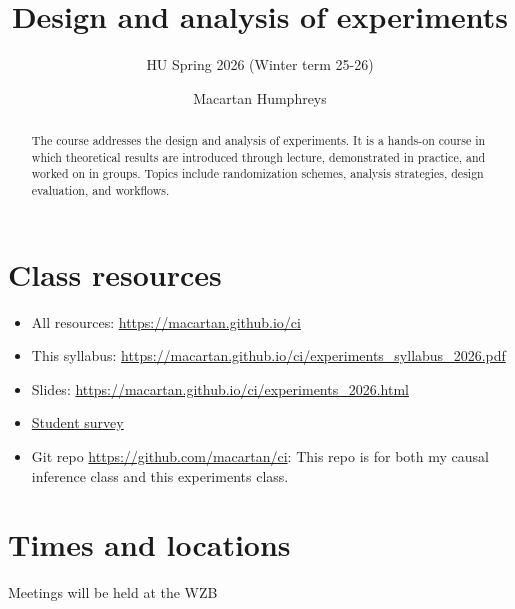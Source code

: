 \documentclass[
  10pt,
  a4paper,10pt]{extarticle}
\title{Design and analysis of experiments}
\subtitle{HU \textbar{} Spring 2026 (Winter term 25-26)}
\author{Macartan Humphreys}
\date{}
\begin{document}
\maketitle
\begin{abstract}
The course addresses the design and analysis of experiments. It is a
hands-on course in which theoretical results are introduced through
lecture, demonstrated in practice, and worked on in groups. Topics
include randomization schemes, analysis strategies, design evaluation,
and workflows.
\end{abstract}


\section{Class resources}\label{class-resources}

\begin{itemize}
\item
  All resources: \url{https://macartan.github.io/ci}
\item
  This syllabus:
  \url{https://macartan.github.io/ci/experiments_syllabus_2026.pdf}
\item
  Slides: \url{https://macartan.github.io/ci/experiments_2026.html}
\item
  \href{https://cloud.wzb.eu/apps/forms/s/8QmokT5GeQfkmkrBHDzrzN4j}{Student
  survey}
\item
  Git repo \url{https://github.com/macartan/ci}: This repo is for both
  my causal inference class and this experiments class.
\end{itemize}

\section{Times and locations}\label{times-and-locations}

Meetings will be held at the WZB
\end{document}
